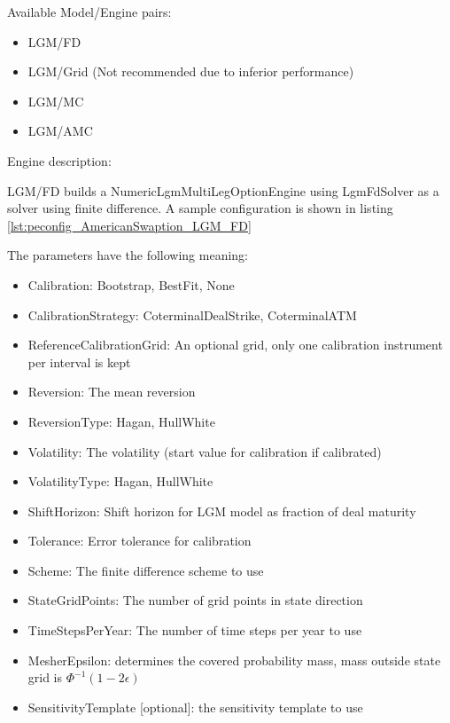 Available Model/Engine pairs:

\begin{itemize}
\item LGM/FD
\item LGM/Grid (Not recommended due to inferior performance)
\item LGM/MC
\item LGM/AMC
\end{itemize}

Engine description:

LGM/FD builds a NumericLgmMultiLegOptionEngine using LgmFdSolver as a solver using finite difference. A sample
configuration is shown in listing \ref{lst:peconfig_AmericanSwaption_LGM_FD}

The parameters have the following meaning:

\begin{itemize}
\item Calibration: Bootstrap, BestFit, None
\item CalibrationStrategy: CoterminalDealStrike, CoterminalATM
\item ReferenceCalibrationGrid: An optional grid, only one calibration instrument per interval is kept
\item Reversion: The mean reversion
\item ReversionType: Hagan, HullWhite
\item Volatility: The volatility (start value for calibration if calibrated)
\item VolatilityType: Hagan, HullWhite
\item ShiftHorizon: Shift horizon for LGM model as fraction of deal maturity
\item Tolerance: Error tolerance for calibration
\item Scheme: The finite difference scheme to use
\item StateGridPoints: The number of grid points in state direction
\item TimeStepsPerYear: The number of time steps per year to use
\item MesherEpsilon: determines the covered probability mass, mass outside state grid is $\Phi^{-1}(1-2\epsilon)$
\item SensitivityTemplate [optional]: the sensitivity template to use 
\end{itemize}

